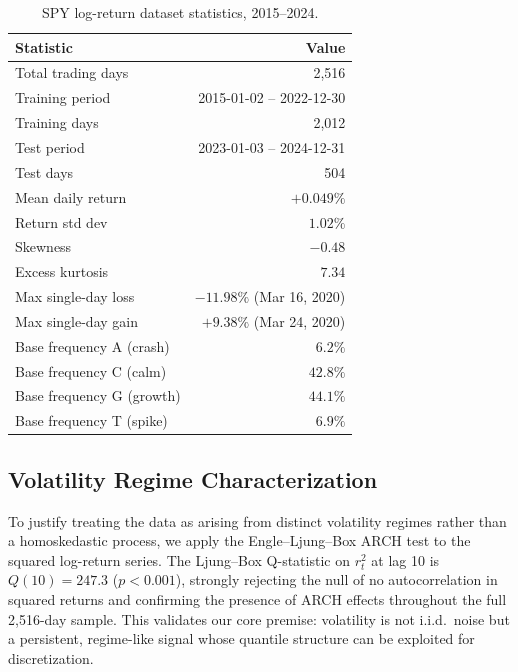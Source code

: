 \documentclass[11pt]{article}
\begin{document}
\begin{table}[h]
\centering
\caption{SPY log-return dataset statistics, 2015--2024.}
\label{tab:data_stats}
\small
\begin{tabular}{lr}
\toprule
\textbf{Statistic} & \textbf{Value} \\
\midrule
Total trading days           & 2,516 \\
Training period              & 2015-01-02 -- 2022-12-30 \\
Training days                & 2,012 \\
Test period                  & 2023-01-03 -- 2024-12-31 \\
Test days                    & 504 \\
Mean daily return            & $+0.049\%$ \\
Return std dev               & $1.02\%$ \\
Skewness                     & $-0.48$ \\
Excess kurtosis              & $7.34$ \\
Max single-day loss          & $-11.98\%$ (Mar 16, 2020) \\
Max single-day gain          & $+9.38\%$ (Mar 24, 2020) \\
\midrule
Base frequency A (crash)     & $6.2\%$ \\
Base frequency C (calm)      & $42.8\%$ \\
Base frequency G (growth)    & $44.1\%$ \\
Base frequency T (spike)     & $6.9\%$ \\
\bottomrule
\end{tabular}
\end{table}

\subsection{Volatility Regime Characterization}

To justify treating the data as arising from distinct volatility
regimes rather than a homoskedastic process, we apply the
Engle--Ljung--Box ARCH test to the squared log-return series.  The
Ljung--Box Q-statistic on $r_t^2$ at lag 10 is $Q(10) = 247.3$
($p < 0.001$), strongly rejecting the null of no autocorrelation in
squared returns and confirming the presence of ARCH effects throughout
the full 2,516-day sample.  This validates our core premise: volatility
is not i.i.d.\ noise but a persistent, regime-like signal whose
quantile structure can be exploited for discretization.
\end{document}
